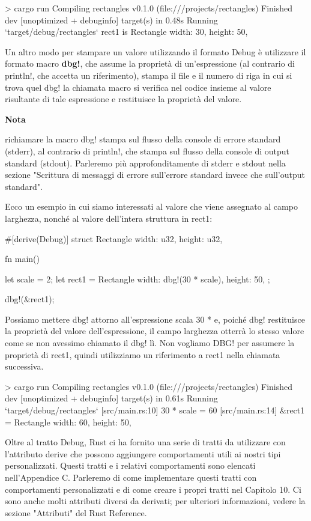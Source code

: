 \documentclass[11pt,a4paper]{article}
\begin{document}
\begin{rust}
> cargo run
   Compiling rectangles v0.1.0 (file:///projects/rectangles)
    Finished dev [unoptimized + debuginfo] target(s) in 0.48s
     Running `target/debug/rectangles`
rect1 is Rectangle {
    width: 30,
    height: 50,
}
\end{rust}
Un altro modo per stampare un valore utilizzando il formato Debug è utilizzare il formato macro \textbf{dbg!}, che assume la proprietà di un'espressione (al contrario di println!, che accetta un riferimento), stampa il file e il numero di riga in cui si trova quel dbg! la chiamata macro si verifica nel codice insieme al valore risultante di tale espressione e restituisce la proprietà del valore.
   \begin{mdframed}
\centerline{\textbf{Nota}}
richiamare la macro dbg! stampa sul flusso della console di errore standard (stderr), al contrario di println!, che stampa sul flusso della console di output standard (stdout). Parleremo più approfonditamente di stderr e stdout nella sezione "Scrittura di messaggi di errore sull'errore standard invece che sull'output standard".
\end{mdframed}
Ecco un esempio in cui siamo interessati al valore che viene assegnato al campo larghezza, nonché al valore dell'intera struttura in rect1:
\begin{rust}
#[derive(Debug)]
struct Rectangle {
    width: u32,
    height: u32,
}

fn main() {
    let scale = 2;
    let rect1 = Rectangle {
        width: dbg!(30 * scale),
        height: 50,
    };

    dbg!(&rect1);
}
\end{rust}
Possiamo mettere dbg! attorno all'espressione scala 30 * e, poiché dbg! restituisce la proprietà del valore dell'espressione, il campo larghezza otterrà lo stesso valore come se non avessimo chiamato il dbg! lì. Non vogliamo DBG! per assumere la proprietà di rect1, quindi utilizziamo un riferimento a rect1 nella chiamata successiva.
\begin{rust}
> cargo run
   Compiling rectangles v0.1.0 (file:///projects/rectangles)
    Finished dev [unoptimized + debuginfo] target(s) in 0.61s
     Running `target/debug/rectangles`
[src/main.rs:10] 30 * scale = 60
[src/main.rs:14] &rect1 = Rectangle {
    width: 60,
    height: 50,
}
\end{rust}
Oltre al tratto Debug, Rust ci ha fornito una serie di tratti da utilizzare con l'attributo derive che possono aggiungere comportamenti utili ai nostri tipi personalizzati. Questi tratti e i relativi comportamenti sono elencati nell'Appendice C. Parleremo di come implementare questi tratti con comportamenti personalizzati e di come creare i propri tratti nel Capitolo 10. Ci sono anche molti attributi diversi da derivati; per ulteriori informazioni, vedere la sezione "Attributi" del Rust Reference.
\end{document}
